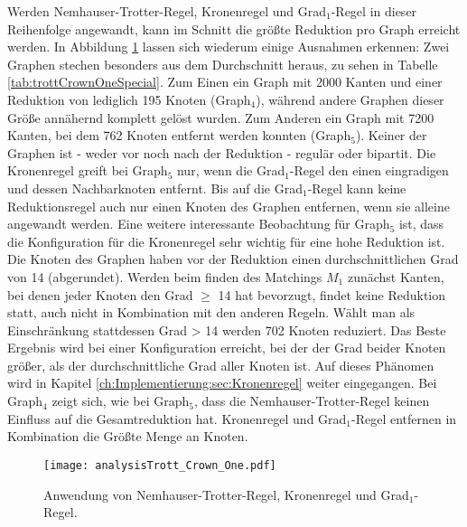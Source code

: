 Werden Nemhauser-Trotter-Regel, Kronenregel und Grad$_{1}$-Regel in dieser Reihenfolge angewandt, kann im Schnitt die größte Reduktion pro Graph erreicht werden. In Abbildung \ref{fig:trottCrownOne} lassen sich wiederum einige Ausnahmen erkennen: Zwei Graphen stechen besonders aus dem Durchschnitt heraus, zu sehen in Tabelle \ref{tab:trottCrownOneSpecial}. Zum Einen ein Graph mit 2000 Kanten und einer Reduktion von lediglich 195 Knoten (Graph$_{4}$), während andere Graphen dieser Größe annähernd komplett gelöst wurden. Zum Anderen ein Graph mit 7200 Kanten, bei dem 762 Knoten entfernt werden konnten (Graph$_{5}$). Keiner der Graphen ist - weder vor noch nach der Reduktion - regulär oder bipartit. Die Kronenregel greift bei Graph$_{5}$ nur, wenn die Grad$_{1}$-Regel den einen eingradigen und dessen Nachbarknoten entfernt. Bis auf die Grad$_{1}$-Regel kann keine Reduktionsregel auch nur einen Knoten des Graphen entfernen, wenn sie alleine angewandt werden. Eine weitere interessante Beobachtung für Graph$_{5}$ ist, dass die Konfiguration für die Kronenregel sehr wichtig für eine hohe Reduktion ist. Die Knoten des Graphen haben vor der Reduktion einen durchschnittlichen Grad von 14 (abgerundet). Werden beim finden des Matchings $M_{1}$ zunächst Kanten, bei denen jeder Knoten den Grad $\geq$ 14 hat bevorzugt, findet keine Reduktion statt, auch nicht in Kombination mit den anderen Regeln. Wählt man als Einschränkung stattdessen Grad > 14 werden 702 Knoten reduziert. Das Beste Ergebnis wird bei einer Konfiguration erreicht, bei der der Grad beider Knoten größer, als der durchschnittliche Grad aller Knoten ist. Auf dieses Phänomen wird in Kapitel \ref{ch:Implementierung:sec:Kronenregel} weiter eingegangen. Bei Graph$_{4}$ zeigt sich, wie bei Graph$_{5}$, dass die Nemhauser-Trotter-Regel keinen Einfluss auf die Gesamtreduktion hat. Kronenregel und Grad$_{1}$-Regel entfernen in Kombination die Größte Menge an Knoten.


\begin{figure}[htb]
\centering
  	{\texttt{[image: analysisTrott\_Crown\_One.pdf]}}
	\caption{Anwendung von Nemhauser-Trotter-Regel, Kronenregel und Grad$_{1}$-Regel.\label{fig:trottCrownOne}}
\centering
\end{figure}


